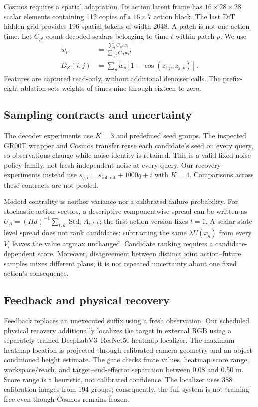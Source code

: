 Cosmos requires a spatial adaptation. Its action latent frame has
$16\times28\times28$ scalar elements containing 112 copies of a
$16\times7$ action block. The last DiT hidden grid provides 196 spatial
tokens of width 2048. A patch is not one action time. Let $C_{pt}$ count
decoded scalars belonging to time $t$ within patch $p$. We use
\begin{align}
\widetilde w_p&=\frac{\sum_t C_{pt}w_t}{\sum_{r,t}C_{rt}w_t},\\
D_Z(i,j)&=\sum_p\widetilde w_p[1-\cos(z_{i,p},z_{j,p})].
\end{align}
Features are captured read-only, without additional denoiser calls.
The prefix-eight ablation sets weights of times nine through sixteen to zero.

\subsection{Sampling contracts and uncertainty}
The decoder experiments use $K=3$ and predefined seed groups. The inspected
GR00T wrapper and Cosmos transfer reuse each candidate's seed on every query,
so observations change while noise identity is retained. This is a valid
fixed-noise policy family, not fresh independent noise at every query.
Our recovery experiments instead use
$s_{q,i}=s_{\mathrm{rollout}}+1000q+i$ with $K=4$.
Comparisons across these contracts are not pooled.

Medoid centrality is neither variance nor a calibrated failure probability.
For stochastic action vectors, a descriptive componentwise spread can be
written as $U_A=(Hd)^{-1}\sum_{t,k}\operatorname{Std}_i A_{i,t,k}$;
the first-action version fixes $t=1$. A scalar state-level spread does not
rank candidates: subtracting the same $\lambda U(x_q)$ from every $V_i$
leaves the value argmax unchanged. Candidate ranking requires a
candidate-dependent score. Moreover, disagreement between distinct joint
action--future samples mixes different plans; it is not repeated uncertainty
about one fixed action's consequence.

\subsection{Feedback and physical recovery}
Feedback replaces an unexecuted suffix using a fresh observation. Our
scheduled physical recovery additionally localizes the target in external RGB
using a separately trained DeepLabV3--ResNet50 heatmap localizer. The maximum
heatmap location is projected through calibrated camera geometry and an
object-conditioned height estimate. The gate checks finite values, heatmap
score range, workspace/reach, and target--end-effector separation between
0.08 and 0.50 m. Score range is a heuristic, not calibrated confidence.
The localizer uses 388 calibration images from 194 groups; consequently,
the full system is not training-free even though Cosmos remains frozen.

